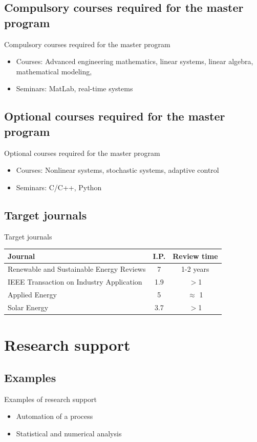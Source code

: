 \documentclass{beamer}
\begin{document}
\subsection{Compulsory courses required for the master program}
\begin{frame}{Compulsory courses required for the master program}
	\begin{itemize}
		\item Courses: Advanced engineering mathematics, linear systems, linear algebra, mathematical modeling,
		\item Seminars: MatLab, real-time systems
	\end{itemize}
\end{frame}
\subsection{Optional courses required for the master program}
\begin{frame}{Optional courses required for the master program}
	\begin{itemize}
		\item Courses: Nonlinear systems, stochastic systems, adaptive control
		\item Seminars: C/C++, Python
	\end{itemize}
\end{frame}
\subsection{Target journals}
\begin{frame}{Target journals}
	\begin{tabular}{|p{7cm}|c|c|}
		\hline
		\textbf{Journal} & \textbf{I.P.} & \textbf{Review time} \\ \hline
		Renewable and Sustainable Energy Reviews & 7 & 1-2 years \\ \hline
		IEEE Transaction on Industry Application & 1.9 &  $>$1  \\ \hline
		Applied Energy & 5 & $\approx$ 1 \\ \hline
		Solar Energy & 3.7 & $>$1 \\ \hline
	\end{tabular}
\end{frame}
\section{Research support}
\subsection{Examples}
\begin{frame}{Examples of research support}
	\begin{itemize}
		\item Automation of a process
		\item Statistical and numerical analysis
	\end{itemize}
\end{frame}
\end{document}
